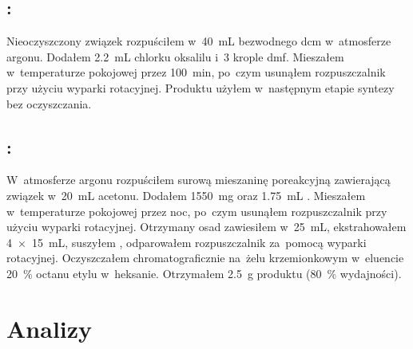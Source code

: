 \subsection{%
  :
}\label{syn:cyclopropyl-methyl-malonate-chloride}
Nieoczyszczony związek  rozpuściłem w~\SI{40}{\milli\liter}
  bezwodnego \gls{dcm} w~atmosferze argonu. Dodałem \SI{2.2}{\milli\liter} chlorku oksalilu
  i~\num{3} krople \gls{dmf}.
Mieszałem w~temperaturze pokojowej przez \SI{100}{\minute}, po~czym usunąłem rozpuszczalnik
  przy użyciu wyparki rotacyjnej.
Produktu użyłem w~następnym etapie syntezy bez oczyszczania.

\subsection{%
  :
}\label{syn:amidoester-cycloprop}
W~atmosferze argonu rozpuściłem surową mieszaninę poreakcyjną zawierającą związek
   w~\SI{20}{\milli\liter} acetonu.
Dodałem \SI{1550}{\milli\gram}  oraz \SI{1.75}{\milli\liter} .
Mieszałem w~temperaturze pokojowej przez noc, po~czym usunąłem rozpuszczalnik przy użyciu
  wyparki rotacyjnej.
Otrzymany osad zawiesiłem w~\SI{25}{\milli\liter},
  ekstrahowałem \SI[product-units = single]{4 x 15}{\milli\liter},
  suszyłem , odparowałem rozpuszczalnik za~pomocą wyparki rotacyjnej.
Oczyszczałem chromatograficznie na~żelu krzemionkowym w~eluencie \SI{20}{\percent} octanu
  etylu w~heksanie.
Otrzymałem \SI{2.5}{\gram} produktu (\SI{80}{\percent} wydajności).


\section{Analizy}\label{experimental:analyses}

